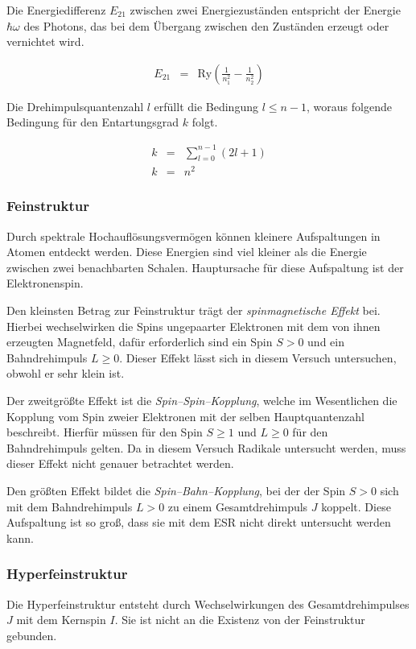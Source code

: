 \documentclass[12pt,a4paper]{scrartcl}
\numberwithin{equation}{section} %
\begin{document}
\noindent
Die Energiedifferenz $E_{21}$ zwischen zwei Energiezuständen entspricht der Energie $\hbar\omega$ des Photons, das bei dem Übergang zwischen den Zuständen erzeugt oder vernichtet wird.

\begin{eqnarray}
	E_{21} &=& \mathrm{Ry} \left( \frac{1}{n_1^2} - \frac{1}{n_2^2} \right)
\end{eqnarray}

\noindent
Die Drehimpulsquantenzahl $l$ erfüllt die Bedingung $l \leq n - 1$, woraus folgende Bedingung für den Entartungsgrad $k$ folgt.

\begin{eqnarray}
	k &=& \sum_{l=0}^{n-1} (2l+1) \\
	k &=& n^2
\end{eqnarray}

\subsubsection{Feinstruktur}
Durch spektrale Hochauflösungsvermögen können kleinere Aufspaltungen in Atomen entdeckt werden. Diese Energien sind viel kleiner als die Energie zwischen zwei benachbarten Schalen. Hauptursache für diese Aufspaltung ist der Elektronenspin. \cite{Weber}

Den kleinsten Betrag zur Feinstruktur trägt der \emph{spinmagnetische Effekt} bei. Hierbei wechselwirken die Spins ungepaarter Elektronen mit dem von ihnen erzeugten Magnetfeld, dafür erforderlich sind ein Spin $S>0$ und ein Bahndrehimpuls $L\geq 0$. Dieser Effekt lässt sich in diesem Versuch untersuchen, obwohl er sehr klein ist.

Der zweitgrößte Effekt ist die \emph{Spin--Spin--Kopplung}, welche im Wesentlichen die Kopplung vom Spin zweier Elektronen mit der selben Hauptquantenzahl beschreibt. Hierfür müssen für den Spin $S\geq 1$ und $L\geq 0$ für den Bahndrehimpuls gelten. Da in diesem Versuch Radikale untersucht werden, muss dieser Effekt nicht genauer betrachtet werden.

Den größten Effekt bildet die \emph{Spin--Bahn--Kopplung}, bei der der Spin $S>0$ sich mit dem Bahndrehimpuls $L>0$ zu einem Gesamtdrehimpuls $J$ koppelt. Diese Aufspaltung ist so groß, dass sie mit dem ESR nicht direkt untersucht werden kann.

\subsubsection{Hyperfeinstruktur}
Die Hyperfeinstruktur entsteht durch Wechselwirkungen des Gesamtdrehimpulses $J$ mit dem Kernspin $I$. Sie ist nicht an die Existenz von der Feinstruktur gebunden.
\end{document}
